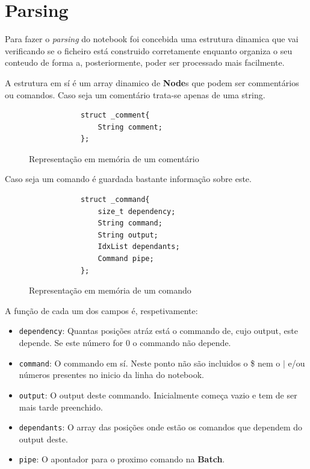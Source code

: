 \documentclass[12pt,a4paper]{report}
\begin{document}
\chapter{Parsing}
    Para fazer o \textit{parsing} do notebook foi concebida uma estrutura
    dinamica que vai verificando se o ficheiro está construido corretamente
    enquanto organiza o seu conteudo de forma a, posteriormente, poder ser
    processado mais facilmente.

    A estrutura em sí é um array dinamico de \textbf{Node}s que podem ser
    commentários ou comandos. Caso seja um comentário trata-se apenas de
    uma string.
    \begin{figure}[h]
        \centering
        \begin{verbatim}
            struct _comment{
                String comment;
            };
        \end{verbatim}
        \caption{Representação em memória de um comentário}
        \label{fig:commentStruct}
    \end{figure}

    Caso seja um comando é guardada bastante informação sobre este.
    \begin{figure}[h]
        \centering
        \begin{verbatim}
            struct _command{
                size_t dependency;
                String command;
                String output;
                IdxList dependants;
                Command pipe;
            };
        \end{verbatim}
        \caption{Representação em memória de um comando}
    \end{figure}

    A função de cada um dos campos é, respetivamente:
    \begin{itemize}
        \item \texttt{dependency}: Quantas posições atráz está o commando
            de, cujo output, este depende. Se este número for 0 o commando não
            depende.

        \item \texttt{command}: O commando em sí. Neste ponto não são
            incluidos o \$ nem o $|$ e/ou números presentes no inicio da linha
            do notebook.

        \item \texttt{output}: O output deste commando. Inicialmente
            começa vazio e tem de ser mais tarde preenchido.

        \item \texttt{dependants}: O array das posições onde estão os
            comandos que dependem do output deste.

        \item \texttt{pipe}: O apontador para o proximo comando na
            \textbf{Batch}.
    \end{itemize}
\end{document}
